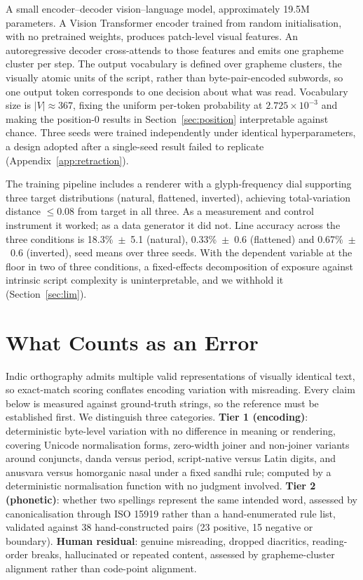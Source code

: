 \documentclass{article}
\begin{document}
A small encoder--decoder vision--language model, approximately 19.5M parameters. A Vision
Transformer encoder trained from random initialisation, with no pretrained weights, produces
patch-level visual features. An autoregressive decoder cross-attends to those features and
emits one grapheme cluster per step. The output vocabulary is defined over grapheme clusters,
the visually atomic units of the script, rather than byte-pair-encoded subwords, so one output
token corresponds to one decision about what was read. Vocabulary size is $|V| \approx 367$,
fixing the uniform per-token probability at $2.725\times10^{-3}$ and making the position-0
results in Section~\ref{sec:position} interpretable against chance. Three seeds were trained
independently under identical hyperparameters, a design adopted after a single-seed result
failed to replicate (Appendix~\ref{app:retraction}).

The training pipeline includes a renderer with a glyph-frequency dial supporting three target
distributions (natural, flattened, inverted), achieving total-variation distance $\leq 0.08$
from target in all three. As a measurement and control instrument it worked; as a data
generator it did not. Line accuracy across the three conditions is 18.3\%~$\pm$~5.1 (natural),
0.33\%~$\pm$~0.6 (flattened) and 0.67\%~$\pm$~0.6 (inverted), seed means over three seeds.
With the dependent variable at the floor in two of three conditions, a fixed-effects
decomposition of exposure against intrinsic script complexity is uninterpretable, and we
withhold it (Section~\ref{sec:lim}).

\section{What Counts as an Error}
\label{sec:scoring}

Indic orthography admits multiple valid representations of visually identical text, so
exact-match scoring conflates encoding variation with misreading. Every claim below is
measured against ground-truth strings, so the reference must be established first. We
distinguish three categories. \textbf{Tier 1 (encoding)}: deterministic byte-level variation
with no difference in meaning or rendering, covering Unicode normalisation forms, zero-width
joiner and non-joiner variants around conjuncts, danda versus period, script-native versus
Latin digits, and anusvara versus homorganic nasal under a fixed sandhi rule; computed by a
deterministic normalisation function with no judgment involved. \textbf{Tier 2 (phonetic)}:
whether two spellings represent the same intended word, assessed by canonicalisation through
ISO 15919 rather than a hand-enumerated rule list, validated against 38 hand-constructed pairs
(23 positive, 15 negative or boundary). \textbf{Human residual}: genuine misreading, dropped
diacritics, reading-order breaks, hallucinated or repeated content, assessed by
grapheme-cluster alignment rather than code-point alignment.
\end{document}
